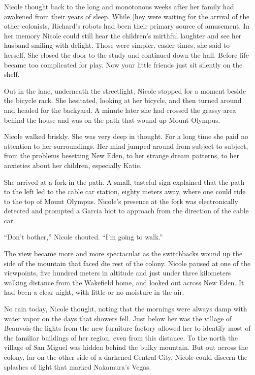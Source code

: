 \documentclass[]{article}
\begin{document}
{Nicole thought back to the long and monotonous weeks after her family had awakened from their years of sleep. While (hey were waiting for the arrival of the other colonists, Richard’s robots had been their primary source of amusement. In her memory Nicole could still hear the children’s mirthful laughter and see her husband smiling with delight. Those were simpler, easier times, she said to herself. She closed the door to the study and continued down the hall. Before life became too complicated for play. Now your little friends just sit silently on the shelf.

Out in the lane, underneath the streetlight, Nicole stopped for a moment beside the bicycle rack. She hesitated, looking at her bicycle, and then turned around and headed for the backyard. A minute later she had crossed the grassy area behind the house and was on the path that wound up Mount Olympus.

Nicole walked briskly. She was very deep in thought. For a long time she paid no attention to her surroundings. Her mind jumped around from subject to subject, from the problems besetting New Eden, to her strange dream patterns, to her anxieties about her children, especially Katie.

She arrived at a fork in the path. A small, tasteful sign explained that the path to the left led to the cable car station, eighty meters away, where one could ride to the top of Mount Olympus. Nicole’s presence at the fork was electronically detected and prompted a Garcia biot to approach from the direction of the cable car.

“Don’t bother,” Nicole shouted. “I’m going to walk.”

The view became more and more spectacular as the switchbacks wound up the side of the mountain that faced die rest of the colony. Nicole paused at one of the viewpoints, five hundred meters in altitude and just under three kilometers walking distance from the Wakefield home, and looked out across New Eden. It had been a clear night, with little or no moisture in the air.

No rain today, Nicole thought, noting that the mornings were always damp with water vapor on the days that showers fell. Just below her was the village of Beauvois-the lights from the new furniture factory allowed her to identify most of the familiar buildings of her region, even from this distance. To the north the village of San Miguel was hidden behind the bulky mountain. But out across the colony, far on the other side of a darkened Central City, Nicole could discern the splashes of light that marked Nakamura’s Vegas.

}
\end{document}
